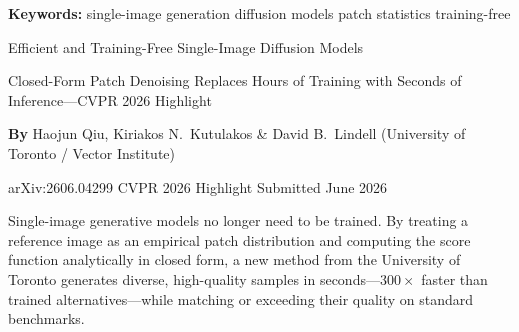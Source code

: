 \documentclass[10pt,twocolumn]{article}
\begin{document}
\setlength{\parindent}{0pt}
\setlength{\parskip}{4pt}

{\small\color{keywordgray}\textbf{Keywords:}
  single-image generation \textbullet{}
  diffusion models \textbullet{}
  patch statistics \textbullet{}
  training-free}\par\vspace{4pt}

{\LARGE\bfseries\raggedright
  Efficient and Training-Free Single-Image Diffusion Models}\par\vspace{4pt}

{\large\itshape\raggedright
  Closed-Form Patch Denoising Replaces Hours of Training with
  Seconds of Inference---CVPR 2026 Highlight}\par\vspace{6pt}

{\small\textbf{By} Haojun Qiu, Kiriakos N.\ Kutulakos \& David B.\ Lindell
  (University of Toronto / Vector Institute)}\par\vspace{2pt}

{\small\color{keywordgray}arXiv:2606.04299 \textbullet{}
  CVPR 2026 Highlight \textbullet{} Submitted June 2026}
\par\vspace{2pt}\noindent{\color{rulered}\rule{\columnwidth}{0.6pt}}\vspace{6pt}

Single-image generative models no longer need to be trained. By treating a
reference image as an empirical patch distribution and computing the score
function analytically in closed form, a new method from the University of
Toronto generates diverse, high-quality samples in seconds---$300\times$ faster
than trained alternatives---while matching or exceeding their quality on
standard benchmarks.
\end{document}
